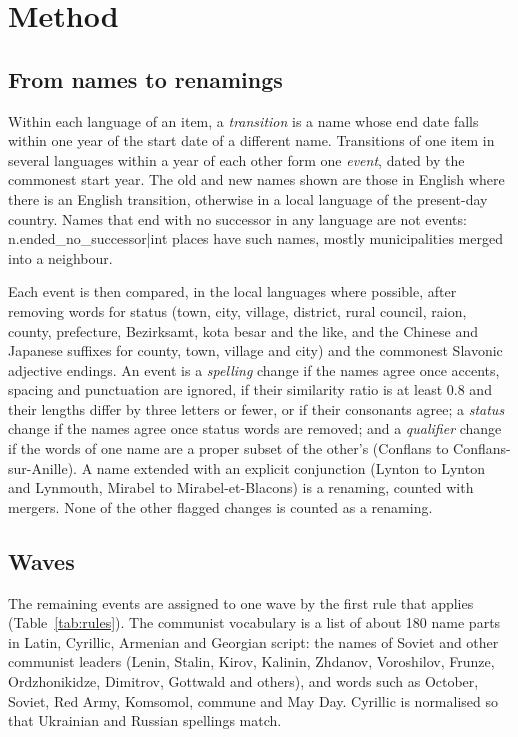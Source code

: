 \documentclass[11pt,a4paper]{article}
\begin{document}
\section{Method}
\subsection{From names to renamings}
Within each language of an item, a \emph{transition} is a name whose end date falls within one year of the start date of a different name. Transitions of one item in several languages within a year of each other form one \emph{event}, dated by the commonest start year. The old and new names shown are those in English where there is an English transition, otherwise in a local language of the present-day country. Names that end with no successor in any language are not events: {{n.ended_no_successor|int}} places have such names, mostly municipalities merged into a neighbour.

Each event is then compared, in the local languages where possible, after removing words for status (town, city, village, district, rural council, raion, county, prefecture, Bezirksamt, kota besar and the like, and the Chinese and Japanese suffixes for county, town, village and city) and the commonest Slavonic adjective endings. An event is a \emph{spelling} change if the names agree once accents, spacing and punctuation are ignored, if their similarity ratio is at least 0.8 and their lengths differ by three letters or fewer, or if their consonants agree; a \emph{status} change if the names agree once status words are removed; and a \emph{qualifier} change if the words of one name are a proper subset of the other's (Conflans to Conflans-sur-Anille). A name extended with an explicit conjunction (Lynton to Lynton and Lynmouth, Mirabel to Mirabel-et-Blacons) is a renaming, counted with mergers. None of the other flagged changes is counted as a renaming.

\subsection{Waves}
The remaining events are assigned to one wave by the first rule that applies (Table~\ref{tab:rules}). The communist vocabulary is a list of about 180 name parts in Latin, Cyrillic, Armenian and Georgian script: the names of Soviet and other communist leaders (Lenin, Stalin, Kirov, Kalinin, Zhdanov, Voroshilov, Frunze, Ordzhonikidze, Dimitrov, Gottwald and others), and words such as October, Soviet, Red Army, Komsomol, commune and May Day. Cyrillic is normalised so that Ukrainian and Russian spellings match.
\end{document}
